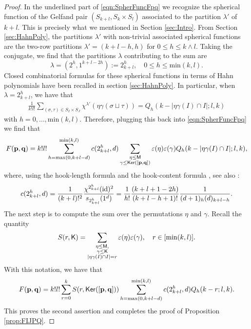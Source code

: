 \documentclass[11pt, a4paper, oneside, reqno]{amsart}
\newcommand{\sK}{{\sf K}}
\newcommand{\copairpq}{{[{\bf p},{\bf q}]}}
\theoremstyle{remark}
\theoremstyle{definition}
\numberwithin{equation}{section}
\begin{document}
\begin{proof}
In the underlined part of \eqref{eqn:SpherFuncFpq} we recognize the spherical function of the Gelfand pair $(S_{k+l},S_k\times S_l)$ associated to the partition $\lambda'$ of $k+l$. This is precisely what we mentioned in Section \ref{sec:Intro}. From Section \ref{sec:HahnPoly}, the partitions $\lambda'$ with non-trivial associated spherical functions are the two-row partitions $\lambda'=({k+l-h},h)$ for $0 \leq h \leq k\wedge l$. Taking the conjugate, we find that the partitions $\lambda$ contributing to the sum are
$$
	\lambda = (2^{h}, 1^{k+l-2h}) := 2^{h}_{k+l}, \quad 0 \leq h \leq \text{min}(k,l).
$$
Closed combinatorial formulas for these spherical functions in terms of Hahn polynomials have been recalled in section \ref{sec:HahnPoly}. In particular, when $\lambda = 2^h_{k+l}$, we have that
\begin{align*}
	\frac{1}{k!l!}\sum_{(\sigma, \tau)\in S_I \times S_J}\chi^{\lambda'}(\eta \gamma (\sigma \sqcup \tau) )= Q_h(k-|\eta\gamma(I)\cap I|; l,k)
\end{align*}
with $h = 0, \ldots,\text{min}(k,l)$.
Therefore, plugging this back into \ref{eqn:SpherFuncFpq} we find that 
\begin{align*}
	F({\bf p}, {\bf q})= k!l!\sum_{h=\max(0,k+l-d)}^{\min(k,l)} c(2^h_{k+l},d) \sum_{\substack{\eta\leq {\sf M} \\ \gamma \leq  {\sf Ker}(\copairpq)}} \varepsilon (\eta)\varepsilon(\gamma) Q_h(k-|\eta\gamma(I)\cap I|;l,k),
\end{align*}
where, using the hook-length formula \cite[Theorem 4.2.14]{ceccherini2010representation} and the hook-content formula \cite[Theorem 4.3.3]{ceccherini2010representation}, see also \cite[Lemma 2.7]{campbell2022commutators} :
\begin{equation}
\label{eqn:coefweingarten}
	c(2^h_{k+l},d)= \frac{1}{(k+l)!^2}\frac{\chi^{2^h_{k+l}}({\rm id})^2}{s_{2^h_{k+l}}(1^d)} = \frac{1}{h!}\frac{(k+l+1-2h)}{(k+l-h+1)!} \frac{1}{(d+1)_h(d)_{k+l-h}}.
\end{equation}
The next step is to compute the sum over the permutations $\eta$ and $\gamma$. Recall the quantity
\begin{equation*} 
	S(r, \sK) = \sum_{\substack{\eta \leq {\sf M}, \\ \gamma \leq {\sf K}\\ |\eta\gamma(I)\cap I|=r}}\varepsilon(\eta)\varepsilon(\gamma),\quad  r \in [\min(k,l)].
\end{equation*}
With this notation, we have that
\begin{equation*}
	F({\bf p}, {\bf q})= k!l!\sum_{r=0}^k S(r, {\sf Ker}(\copairpq)) \sum_{h=\max(0,k+l-d)}^{\min(k,l)} c(2^h_{k+l},d) Q_h(k-r; l,k).
\end{equation*}
This proves the second assertion and completes the proof of Proposition \ref{prop:FIJPQ}.
\end{proof}
\end{document}
